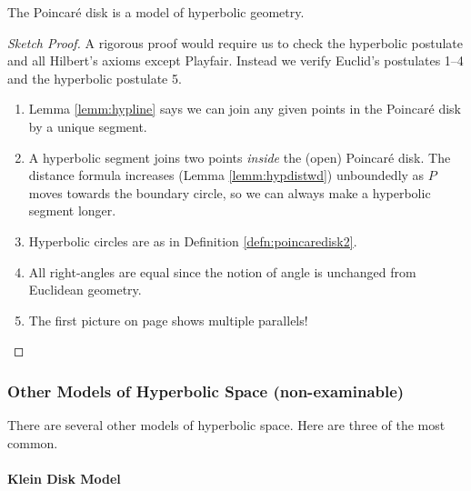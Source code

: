 \begin{thm}{}{}
	The Poincaré disk is a model of hyperbolic geometry.
\end{thm}

\begin{proof}[Sketch Proof]
	A rigorous proof would require us to check the hyperbolic postulate and all Hilbert's axioms except Playfair. Instead we verify Euclid's postulates 1--4 and the hyperbolic postulate 5.
	\begin{enumerate}
	  \item Lemma \ref{lemm:hypline} says we can join any given points in the Poincaré disk by a unique segment.
	  \item A hyperbolic segment joins two points \emph{inside} the (open) Poincaré disk. The distance formula increases (Lemma \ref{lemm:hypdistwd}) unboundedly as $P$ moves towards the boundary circle, so we can always make a hyperbolic segment longer.
	  \item Hyperbolic circles are as in Definition \ref{defn:poincaredisk2}.
	  \item All right-angles are equal since the notion of angle is unchanged from Euclidean geometry.
	  \item The first picture on page \pageref{sec:hyp-models} shows multiple parallels!\hfill{\qedhere}
	\end{enumerate}
\end{proof}





\subsubsection*{Other Models of Hyperbolic Space (non-examinable)}

There are several other models of hyperbolic space. Here are three of the most common.

\paragraph{Klein Disk Model}

